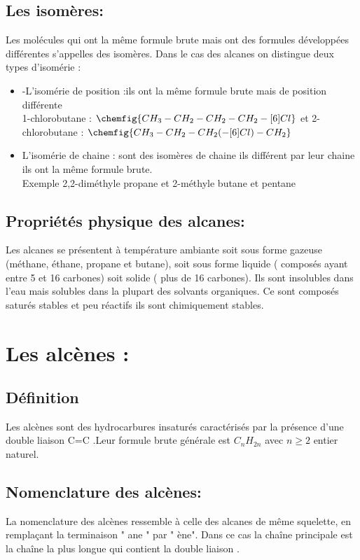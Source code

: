 \documentclass[12pt]{article}
\begin{document}
\subsection{Les isomères:}
Les molécules qui ont la même formule brute mais ont des formules développées différentes s'appelles des isomères.
Dans le cas des alcanes on distingue deux types d'isomérie :
\begin{itemize}
  \item -L'isomérie de position :ils ont la même formule brute mais de position différente\\ 1-chlorobutane : $\chemfig{CH_3-CH_2-CH_2-CH_2-[6]Cl}$ et 2-chlorobutane :  $\chemfig{CH_3-CH_2-CH_2(-[6]Cl)-CH_2}$
  \item L'isomérie de chaine : sont des isomères de chaine ils différent par leur chaine ils ont la même formule brute.\\Exemple 2,2-diméthyle propane et 2-méthyle butane et pentane
\end{itemize}
\subsection{Propriétés physique des alcanes:}
Les alcanes se présentent à température ambiante soit sous forme gazeuse (méthane, éthane, propane et butane), soit
sous forme liquide ( composés ayant entre 5 et 16 carbones) soit solide ( plus de 16 carbones). Ils sont insolubles dans
l'eau mais solubles dans la plupart des solvants organiques. Ce sont composés saturés stables et peu réactifs ils sont
chimiquement stables.

\section{Les alcènes :}
\subsection{Définition }
Les alcènes sont des hydrocarbures insaturés caractérisés par la présence d'une double liaison C=C .Leur formule brute  générale est $C_nH_{2n}$ avec $n\geq2$ entier naturel.
\subsection{Nomenclature des alcènes: }
La nomenclature des alcènes ressemble à celle des alcanes de même squelette, en remplaçant la terminaison " ane " par " ène". Dans ce cas la chaîne principale est la chaîne la plus longue qui contient la double liaison .
\end{document}
